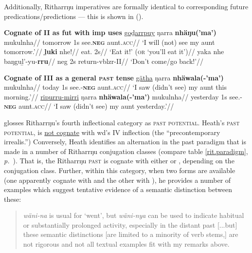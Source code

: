 Additionally, Ritharrŋu imperatives are formally identical to corresponding future predications/predictions \citeyearpar[76]{Heath1980r} --- this is shown in (\nextx).

\pex \textbf{Cognate of \gls{II} as \gls{fut} with \gls{imp} uses}
\a\begingl\gla \ul{goḏarrpuy} ŋarra \textbf{nhäŋu(\textdblhyphen'ma')} mukulnha//
\glb tomorrow 1s see.\II\textdblhyphen\textsc{\textbf{neg}} aunt.\textsc{acc}//
\glft`I will (not) see my aunt tomorrow.'\trailingcitation{[DW~20190522]}//\endgl
\a\begingl\gla \textbf{ḻuki} nhe!//
\glb eat.\II{} 2s//
\glft`Eat it!' (\textsc{or} `you'll eat it')//\endgl
\a\begingl\gla yaka nhe baŋguḻ'-yu-\textbf{rru}//
\glb \gls{neg} 2s return-\gls{vblzr}-\gls{II}//
\glft`Don't come/go back!'//\endgl
\xe

\pex \textbf{Cognate of \gls{III} as a general \textsc{past} tense}
\a\begingl\gla {}\ul{gätha} ŋarra \textbf{nhäwala}\textbf{(-'ma')} mukulnha//
\glb today 1s see.\textbf{\III}{-\textsc{\textbf{neg}}} aunt.\textsc{acc}//
\glft`I saw (didn't see) my aunt this morning.'\trailingcitation{[RN~20190522]}//\endgl
\a\begingl\gla {}\ul{ripurru-mirri} ŋarra \textbf{nhäwala}{\textbf{(-'ma')}} mukulnha//
\glb yesterday 1s see.\textbf{\III}{-\textsc{\textbf{neg}}} aunt.\textsc{acc}//
\glft`I saw (didn't see) my aunt yesterday.'\trailingcitation{[RN~20190522]}//\endgl{}
\xe


\citet[74-5]{Heath1980r} glosses Ritharrŋu's fourth inflectional category as \textsc{past potential}. Heath's \textsc{past potential}, is \ul{not cognate} with \gls{wd}'s \gls{IV} inflection (the ``precontemporary irrealis.'') Conversely, Heath identifies an alternation in the past paradigm that is made in a number of Ritharrŋu conjugation classes (compare table \ref{rit.paradigm}, \textit{p.}~\pageref{rit.paradigm}). That is, the Ritharrŋu \textsc{past} is cognate with either \III{} or \IV{}, depending on the conjugation class. Further, within this category, when two forms are available (one apparently cognate with \III{} and the other with \IV{}), he provides a number of examples which suggest tentative evidence of a semantic distinction between these: 
\begin{quote} \textit{wäni-na} is usual for `went', but \textit{wäni-nya} can be used to indicate habitual or substantially prolonged activity, especially in the distant past [...but] these semantic distinctions [are limited to a minority of verb stems,] are not rigorous and not all textual examples fit with my remarks above.
\end{quote}


